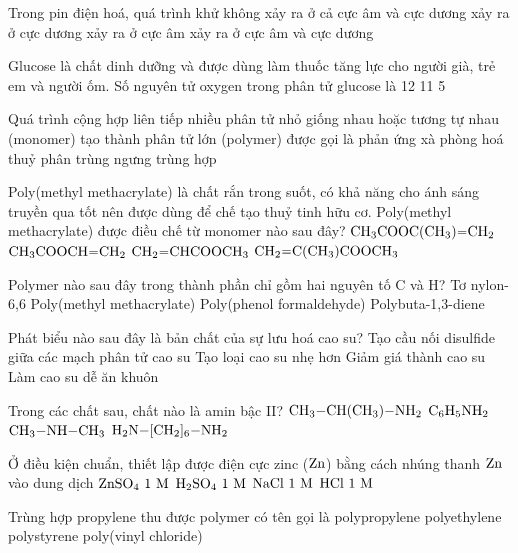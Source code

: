 \documentclass[11pt,a4paper]{article}
\begin{document}
\begin{ex}
Trong pin điện hoá, quá trình khử
\choice
{không xảy ra ở cả cực âm và cực dương}
{\True xảy ra ở cực dương}
{xảy ra ở cực âm}
{xảy ra ở cực âm và cực dương}
\end{ex}
\begin{ex}
Glucose là chất dinh dưỡng và được dùng làm thuốc tăng lực cho người già, trẻ em và người ốm. Số nguyên tử oxygen trong phân tử glucose là
\choice
{12}
{}
{11}
{5}
\end{ex}
\begin{ex}
Quá trình cộng hợp liên tiếp nhiều phân tử nhỏ giống nhau hoặc tương tự nhau (monomer) tạo thành phân tử lớn (polymer) được gọi là phản ứng
\choice
{xà phòng hoá}
{thuỷ phân}
{trùng ngưng}
{\True trùng hợp}
\end{ex}
\begin{ex}
Poly(methyl methacrylate) là chất rắn trong suốt, có khả năng cho ánh sáng truyền qua tốt nên được dùng để chế tạo thuỷ tinh hữu cơ. Poly(methyl methacrylate) được điều chế từ monomer nào sau đây?
\choice
{$\ce{CH3COOC(CH3)=CH2}$}
{$\ce{CH3COOCH=CH2}$}
{$\ce{CH2=CHCOOCH3}$}
{\True $\ce{CH2=C(CH3)COOCH3}$}
\end{ex}
\begin{ex}
Polymer nào sau đây trong thành phần chỉ gồm hai nguyên tố C và H?
\choice
{Tơ nylon-6,6}
{Poly(methyl methacrylate)}
{Poly(phenol formaldehyde)}
{\True Polybuta-1,3-diene}
\end{ex}
\begin{ex}
Phát biểu nào sau đây là bản chất của sự lưu hoá cao su?
\choice
{\True Tạo cầu nối disulfide giữa các mạch phân tử cao su}
{Tạo loại cao su nhẹ hơn}
{Giảm giá thành cao su}
{Làm cao su dễ ăn khuôn}
\end{ex}
\begin{ex}
Trong các chất sau, chất nào là amin bậc II?
\choice
{$\ce{CH3-CH(CH3)-NH2}$}
{$\ce{C6H5NH2}$}
{\True $\ce{CH3-NH-CH3}$}
{$\ce{H2N-[CH2]6-NH2}$}
\end{ex}
\begin{ex}
Ở điều kiện chuẩn, thiết lập được điện cực zinc ($\ce{Zn}$) bằng cách nhúng thanh $\ce{Zn}$ vào dung dịch
\choice
{\True $\ce{ZnSO4}\ 1\text{ M}$}
{$\ce{H2SO4}\ 1\text{ M}$}
{$\ce{NaCl}\ 1\text{ M}$}
{$\ce{HCl}\ 1\text{ M}$}
\end{ex}
\begin{ex}
Trùng hợp propylene thu được polymer có tên gọi là
\choice
{\True polypropylene}
{polyethylene}
{polystyrene}
{poly(vinyl chloride)}
\end{ex}
\end{document}
